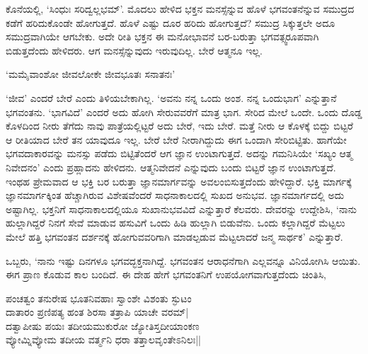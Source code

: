 ಕೊನೆಯಲ್ಲಿ, `ಸಿಂಧುಃ ಸರಿದ್ವಲ್ಲಭಮ್'. ಮೊದಲು ಹೇಳಿದ ಭಕ್ತನ ಮನಸ್ಸೆನ್ನುವ ಹೊಳೆ ಭಗವಂತನೆನ್ನುವ ಸಮುದ್ರದ ಕಡೆಗೆ ಹರಿದುಕೊಂಡೇ ಹೋಗುತ್ತದೆ. ಹೊಳೆ ಎಷ್ಟು ದೂರ ಹರಿದು ಹೋಗುತ್ತದೆ? ಸಮುದ್ರ ಸಿಕ್ಕುತ್ತಲೇ ಅದೂ ಸಮುದ್ರವಾಗಿಯೇ ಆಗಬೇಕು. ಅದೇ ರೀತಿ ಭಕ್ತನ ಈ ಮನೋಭಾವನೆ ಬರ-ಬರುತ್ತಾ ಭಗವತ್ಸ್ವರೂಪವಾಗಿ ಬಿಡುತ್ತದೆಂದು ಹೇಳಿದರು. ಆಗ ಮನಸ್ಸೆನ್ನುವುದು ಇರುವುದಿಲ್ಲ. ಬೇರೆ ಆತ್ಮನೂ ಇಲ್ಲ.

\begin{shloka}
`ಮಮೈವಾಂಶೋ ಜೀವಲೋಕೇ ಜೀವಭೂತಃ ಸನಾತನಃ'
\end{shloka}

`ಜೀವ' ಎಂದರೆ ಬೇರೆ ಎಂದು ತಿಳಿಯಬೇಕಾಗಿಲ್ಲ. `ಅವನು ನನ್ನ ಒಂದು ಅಂಶ. ನನ್ನ ಒಂದುಭಾಗ' ಎನ್ನುತ್ತಾನೆ ಭಗವಂತನು. `ಭಾಗವಿದೆ' ಎಂದರೆ ಅದು ಹೋಗಿ ಸೇರುವವರೆಗೆ ಮಾತ್ರ ಭಾಗ. ಸೇರಿದ ಮೇಲೆ ಒಂದೇ. ಒಂದು ದೊಡ್ಡ ಕೊಳದಿಂದ ನೀರು ತೆಗೆದು ನಾವು ಪಾತ್ರೆಯಲ್ಲಿಟ್ಟರೆ ಅದು ಬೇರೆ, ಇದು ಬೇರೆ. ಮತ್ತೆ ನೀರು ಆ ಕೊಳಕ್ಕೆ ಬಿದ್ದು ಬಿಟ್ಟರೆ ಆ ರೀತಿಯಾದ ಬೇರೆ ತನ ಯಾವುದೂ ಇಲ್ಲ. ಬೇರೆ ಬೇರೆ ನೀರಾಗಿದ್ದುದು ಈಗ ಒಂದಾಗಿ ಸೇರಿಬಿಟ್ಟಿತು. ಹಾಗೆಯೇ ಭಗವದಾಕಾರವನ್ನು ಮನಸ್ಸು ಪಡೆದು ಬಿಟ್ಟಿತೆಂದರೆ ಆಗ ಜ್ಞಾನ ಉಂಟಾಗುತ್ತದೆ. ಅದನ್ನು ಗಮನಿಸಿಯೇ `ಸಖ್ಯಂ ಆತ್ಮ ನಿವೇದನಂ' ಎಂದು ಪ್ರಹ್ಲಾದನು ಹೇಳಿದನು. ಆತ್ಮನಿವೇದನೆ ಎನ್ನುವುದು ಬಂದು ಬಿಟ್ಟರೆ ಜ್ಞಾನ ಉಂಟಾಗುತ್ತದೆ. ಇಂಥಹ ಪ್ರೇಮವಾದ ಆ ಭಕ್ತಿ ಬರ ಬರುತ್ತಾ ಜ್ಞಾನಮಾರ್ಗವನ್ನು ಅವಲಂಬಿಸುತ್ತದೆಂದು ಹೇಳಿದ್ದಾರೆ. ಭಕ್ತಿ ಮಾರ್ಗಕ್ಕೆ ಜ್ಞಾನಮಾರ್ಗಕ್ಕಿಂತ ಹೆಚ್ಚಾಗಿರುವ ವಿಶೇಷವೆಂದರೆ ಸಾಧನಾಕಾಲದಲ್ಲಿ ಸುಖದ ಅನುಭವ. ಜ್ಞಾನಮಾರ್ಗದಲ್ಲಿ ಅದು ಅಷ್ಟಾಗಿಲ್ಲ. ಭಕ್ತನಿಗೆ ಸಾಧನಾಕಾಲದಲ್ಲಿಯೂ ಸುಖಾನುಭವವಿದೆ ಎನ್ನುತ್ತಾರೆ ಕೆಲವರು. ದೇವರನ್ನು ಉದ್ದೇಶಿಸಿ, `ನಾನು ಹುಲ್ಲಾಗಿದ್ದರೆ ನಿನಗೆ ಸೇವೆ ಮಾಡುವ ಹಸುವಿಗೆ ಒಂದು ಹಿಡಿ ಹುಲ್ಲಾಗಿ ಬಿಡುವೆನು. ಒಂದು ಕಲ್ಲಾಗಿದ್ದರೆ ಮೆಟ್ಟಲು ಮೇಲೆ ಹತ್ತಿ ಭಗವಂತನ ದರ್ಶನಕ್ಕೆ ಹೋಗುವವರಿಗಾಗಿ ಮಾಡಲ್ಪಡುವ ಮೆಟ್ಟಲಾದರೆ ಜನ್ಮ ಸಾರ್ಥಕ' ಎನ್ನುತ್ತಾರೆ.

ಒಬ್ಬರು, `ನಾನು ಇಷ್ಟು ದಿನಗಳೂ ಭಗವದ್ಭಕ್ತನಾಗಿದ್ದೆ. ಭಗವಂತನ ಆರಾಧನೆಗಾಗಿ ಎಲ್ಲವನ್ನೂ ವಿನಿಯೋಗಿಸಿ ಆಯಿತು. ಈಗ ಪ್ರಾಣ ಕೊಡುವ ಕಾಲ ಬಂದಿದೆ. ಈ ದೇಹ ಹೇಗೆ ಭಗವಂತನಿಗೆ ಉಪಯೋಗವಾಗುತ್ತದೆಂದು ಚಿಂತಿಸಿ,

\begin{shloka}
ಪಂಚತ್ವಂ ತನುರೇಷ ಭೂತನಿವಹಾಃ ಸ್ವಾಂಶೇ ವಿಶಂತು ಸ್ಫುಟಂ\\
ದಾತಾರಂ ಪ್ರಣಿಪತ್ಯ ಹಂತ ಶಿರಸಾ ತತ್ರಾಪಿ ಯಾಚೇ ವರಮ್|\\
ದತ್ವಾಪೀಷು ಪಯಃ ತದೀಯಮುಕುರೋ ಜ್ಯೋತಿಸ್ತದೀಯಾಂಕಣ\\
ವ್ಯೋಮ್ನಿವ್ಯೋಮ ತದೀಯ ವರ್ತ್ಮನಿ ಧರಾ ತತ್ತಾಲವೃಂತೇಽನಿಲಃ||
\end{shloka}

